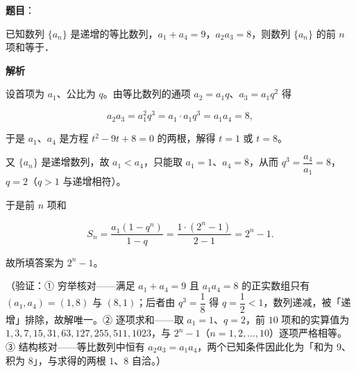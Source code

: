 \begin{answer}

\textbf{题目}：

已知数列 \(\{a_n\}\) 是递增的等比数列，\(a_1+a_4=9\)，\(a_2a_3=8\)，则数列 \(\{a_n\}\) 的前 \(n\) 项和等于\gkblank{}．

\textbf{解析}

设首项为 \(a_1\)、公比为 \(q\)。由等比数列的通项 \(a_2=a_1q\)、\(a_3=a_1q^{2}\) 得

\nopagebreak[4]
\[ a_2a_3=a_1^{2}q^{3}=a_1\cdot a_1q^{3}=a_1a_4=8, \]

于是 \(a_1\)、\(a_4\) 是方程 \(t^{2}-9t+8=0\) 的两根，解得 \(t=1\) 或 \(t=8\)。

又 \(\{a_n\}\) 是递增数列，故 \(a_1<a_4\)，只能取 \(a_1=1\)、\(a_4=8\)，从而 \(q^{3}=\dfrac{a_4}{a_1}=8\)，\(q=2\)（\(q>1\) 与递增相符）。

于是前 \(n\) 项和

\nopagebreak[4]
\[ S_n=\dfrac{a_1(1-q^{n})}{1-q}=\dfrac{1\cdot(2^{n}-1)}{2-1}=2^{n}-1 . \]

故所填答案为 \(2^{n}-1\)。

（验证：① 穷举核对——满足 \(a_1+a_4=9\) 且 \(a_1a_4=8\) 的正实数组只有 \((a_1,a_4)=(1,8)\) 与 \((8,1)\)；后者由 \(q^{3}=\dfrac{1}{8}\) 得 \(q=\dfrac{1}{2}<1\)，数列递减，被「递增」排除，故解唯一。② 逐项求和——取 \(a_1=1\)、\(q=2\)，前 \(10\) 项和的实算值为 \(1,3,7,15,31,63,127,255,511,1023\)，与 \(2^{n}-1\)（\(n=1,2,\dots,10\)）逐项严格相等。③ 结构核对——等比数列中恒有 \(a_2a_3=a_1a_4\)，两个已知条件因此化为「和为 \(9\)、积为 \(8\)」，与求得的两根 \(1\)、\(8\) 自洽。）


\end{answer}
